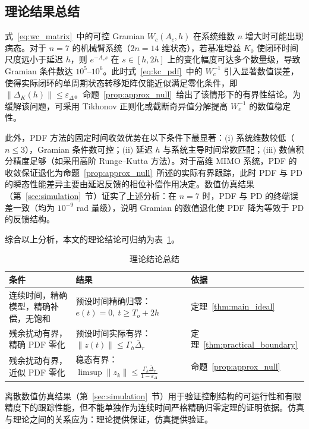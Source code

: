 \subsection{理论结果总结}

\begin{remark}
  式~\eqref{eq:wc_matrix}~中的可控 Gramian \(W_c(A_c,h)\) 在系统维数 \(n\) 增大时可能出现病态。对于 \(n=7\) 的机械臂系统（\(2n=14\) 维状态），若基准增益 \(K_0\) 使闭环时间尺度远小于延迟 \(h\)，则 \(e^{-A_c s}\) 在 \(s\in[h,2h]\) 上的变化幅度可达多个数量级，导致 Gramian 条件数达 \(10^5\!\)--\(10^6\)。此时式~\eqref{eq:kc_pdf}~中的 \(W_c^{-1}\) 引入显著数值误差，使得实际闭环的单周期状态转移矩阵仅能近似满足零化条件，即 \(\|\Delta_K(h)\|\le\varepsilon_\Delta\)。命题~\ref{prop:approx_null}~给出了该情形下的有界性结论。为缓解该问题，可采用 Tikhonov 正则化或截断奇异值分解提高 \(W_c^{-1}\) 的数值稳定性。

  此外，PDF 方法的固定时间收敛优势在以下条件下最显著：\(\text{(i)}\) 系统维数较低（\(n\le 3\)），Gramian 条件数可控；\(\text{(ii)}\) 延迟 \(h\) 与系统主导时间常数匹配；\(\text{(iii)}\) 数值积分精度足够（如采用高阶 Runge--Kutta 方法）。对于高维 MIMO 系统，PDF 的收敛保证退化为命题~\ref{prop:approx_null}~所述的实际有界跟踪，此时 PDF 与 PD 的瞬态性能差异主要由延迟反馈的相位补偿作用决定。数值仿真结果（第~\ref{sec:simulation}~节）证实了上述分析：在 \(n=7\) 时，PDF 与 PD 的终端误差一致（均为 \(10^{-9}\) rad 量级），说明 Gramian 的数值退化使 PDF 降为等效于 PD 的反馈结构。
\end{remark}

综合以上分析，本文的理论结论可归纳为表~\ref{tab:theory_summary}。

\begin{table}[H]
\centering
\caption{理论结论总结}
\label{tab:theory_summary}
\begin{tabular}{p{3cm}p{6cm}p{5cm}}
\toprule
条件 & 结果 & 依据 \\
\midrule
连续时间，精确模型，精确补偿，无饱和 & 预设时间精确归零：\(e(t)=0,\ t\ge T_o+2h\) & 定理~\ref{thm:main_ideal} \\
残余扰动有界，精确 PDF 零化 & 预设时间实际有界：\(\|z(t)\|\le \Gamma_h\bar\Delta_r\) & 定理~\ref{thm:practical_boundary} \\
残余扰动有界，近似 PDF 零化 & 稳态有界：\(\displaystyle\limsup\|z_k\|\le \frac{\Gamma_h\bar\Delta_r}{1-\varepsilon_\Delta}\) & 命题~\ref{prop:approx_null} \\
\bottomrule
\end{tabular}
\end{table}

\begin{remark}[离散数值仿真的定位]
  离散数值仿真结果（第~\ref{sec:simulation}~节）用于验证控制结构的可运行性和有限精度下的跟踪性能，但不能单独作为连续时间严格精确归零定理的证明依据。仿真与理论之间的关系应为：理论提供保证，仿真提供验证。
\end{remark}